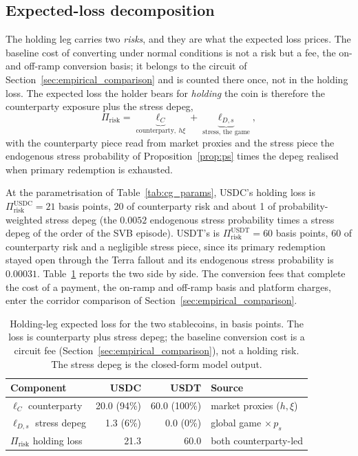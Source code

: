\subsection{Expected-loss decomposition}\label{sec:identification}

The holding leg carries two \emph{risks}, and they are what the expected loss prices. The baseline cost of converting under normal conditions is not a risk but a fee, the on- and off-ramp conversion basis; it belongs to the circuit of Section~\ref{sec:empirical_comparison} and is counted there once, not in the holding loss. The expected loss the holder bears for \emph{holding} the coin is therefore the counterparty exposure plus the stress depeg,
\[
  \Pi_{\text{risk}} = \underbrace{\ell_C}_{\text{counterparty},\ h\xi} + \underbrace{\ell_{D,s}}_{\text{stress, the game}},
\]
with the counterparty piece read from market proxies and the stress piece the endogenous stress probability of Proposition~\ref{prop:ps} times the depeg realised when primary redemption is exhausted.

At the parametrisation of Table~\ref{tab:cg_params}, USDC's holding loss is $\Pi_{\text{risk}}^{\text{USDC}} = 21$ basis points, 20 of counterparty risk and about 1 of probability-weighted stress depeg (the $0.0052$ endogenous stress probability times a stress depeg of the order of the SVB episode). USDT's is $\Pi_{\text{risk}}^{\text{USDT}} = 60$ basis points, 60 of counterparty risk and a negligible stress piece, since its primary redemption stayed open through the Terra fallout and its endogenous stress probability is $0.00031$. Table~\ref{tab:dual_asset_premium} reports the two side by side. The conversion fees that complete the cost of a payment, the on-ramp and off-ramp basis and platform charges, enter the corridor comparison of Section~\ref{sec:empirical_comparison}.

\begin{table}[H]
\centering
\caption{Holding-leg expected loss for the two stablecoins, in basis points. The loss is counterparty plus stress depeg; the baseline conversion cost is a circuit fee (Section~\ref{sec:empirical_comparison}), not a holding risk. The stress depeg is the closed-form model output.}\label{tab:dual_asset_premium}
\begin{tabular}{lrrl}
\toprule
Component & USDC & USDT & Source \\
\midrule
$\ell_C$ counterparty            & 20.0 (94\%) & 60.0 (100\%) & market proxies ($h,\xi$) \\
$\ell_{D,s}$ stress depeg         & \phantom{0}1.3 \phantom{00}(6\%)  & \phantom{00}0.0 \phantom{0}(0\%) & global game $\times\, p_s$ \\
$\Pi_{\text{risk}}$ holding loss  & 21.3        & 60.0        & both counterparty-led \\
\bottomrule
\end{tabular}
\end{table}

